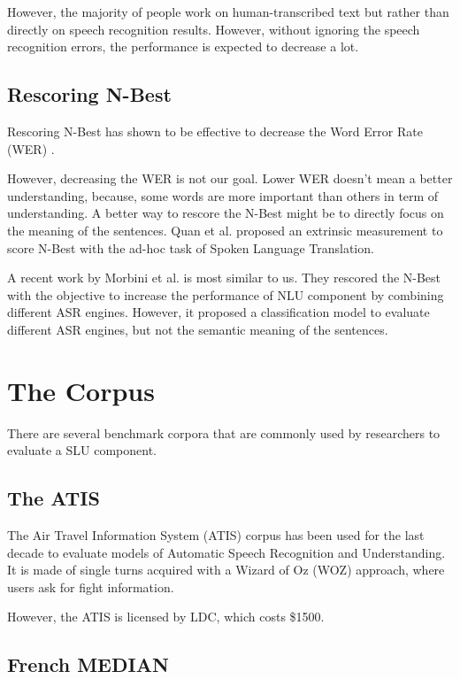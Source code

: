 \documentclass[11pt,letterpaper]{article}
\begin{document}
However, the majority of people work on human-transcribed text but rather than directly on speech recognition results. However, without ignoring the speech recognition errors, the performance is expected to decrease a lot. 

\subsection{Rescoring N-Best}
Rescoring N-Best has shown to be effective to decrease the Word Error Rate (WER) \cite{Zhang:2004,Zhou:2006}.

However, decreasing the WER is not our goal. Lower WER doesn't mean a better understanding, because, some words are more important than others in term of understanding. A better way to rescore the N-Best might be to directly focus on the meaning of the sentences. Quan et al.  proposed an extrinsic measurement to score N-Best with the ad-hoc task of Spoken Language Translation.

A recent work by Morbini et al.  is most similar to us. They rescored the N-Best with the objective to increase the performance of NLU component by combining different ASR engines. However, it proposed a classification model to evaluate different ASR engines, but not the semantic meaning of the sentences.

\section{The Corpus}

There are several benchmark corpora that are commonly used by researchers to evaluate a SLU component.

\subsection{The ATIS}
The Air Travel Information System (ATIS) corpus \cite{Dahl:1994} has been used for the last decade to evaluate models of Automatic Speech Recognition and Understanding. It is made of single turns acquired with a Wizard of Oz (WOZ) approach, where users ask for fight information.

However, the ATIS is licensed by LDC, which costs \$1500.

\subsection{French MEDIAN}
\end{document}
